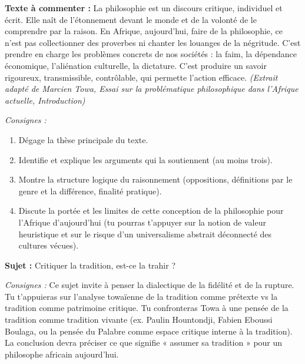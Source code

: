 \documentclass[11pt]{article}
\newcommand{\cle}[1]{{\popxbold\color{popdark}#1}}
\begin{document}
\begin{exercice}
\textbf{Texte à commenter :}
\guillemotleft La philosophie est un discours critique, individuel et écrit. Elle naît de l'étonnement devant le monde et de la volonté de le comprendre par la raison. En Afrique, aujourd'hui, faire de la philosophie, ce n'est pas collectionner des proverbes ni chanter les louanges de la négritude. C'est prendre en charge les problèmes concrets de nos sociétés : la faim, la dépendance économique, l'aliénation culturelle, la dictature. C'est produire un savoir rigoureux, transmissible, contrôlable, qui permette l'action efficace. \guillemotright
\textit{(Extrait adapté de Marcien Towa, \emph{Essai sur la problématique philosophique dans l'Afrique actuelle}, Introduction)}

\textit{Consignes :}
\begin{enumerate}
\item Dégage la thèse principale du texte.
\item Identifie et explique les arguments qui la soutiennent (au moins trois).
\item Montre la structure logique du raisonnement (oppositions, définitions par le genre et la différence, finalité pratique).
\item Discute la portée et les limites de cette conception de la philosophie pour l'Afrique d'aujourd'hui (tu pourras t'appuyer sur la notion de \cle{valeur heuristique} et sur le risque d'un \cle{universalisme abstrait} déconnecté des cultures vécues).
\end{enumerate}
\end{exercice}

\begin{exercice}
\textbf{Sujet :} \guillemotleft Critiquer la tradition, est-ce la trahir ? \guillemotright

\textit{Consignes :} Ce sujet invite à penser la dialectique de la fidélité et de la rupture. Tu t'appuieras sur l'analyse towaïenne de la tradition comme \cle{prétexte} vs la tradition comme \cle{patrimoine critique}. Tu confronteras Towa à une pensée de la tradition comme \cle{tradition vivante} (ex. Paulin Hountondji, Fabien Eboussi Boulaga, ou la pensée du \cle{Palabre} comme espace critique interne à la tradition). La conclusion devra préciser ce que signifie « assumer sa tradition » pour un philosophe africain aujourd'hui.
\end{exercice}
\end{document}
